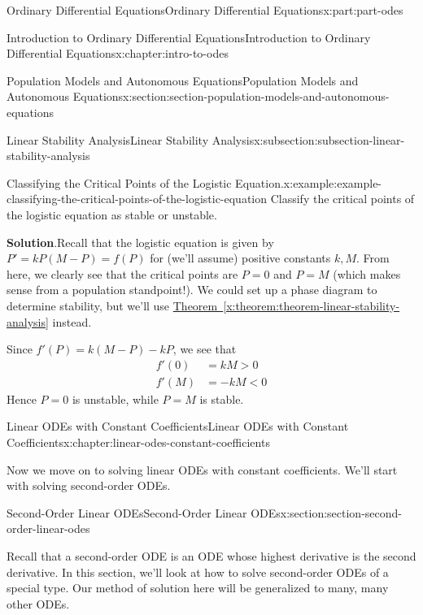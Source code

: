 \documentclass[oneside,10pt,]{book}
\newcommand{\blocktitlefont}{\relax}
\newcommand{\xreffont}{\relax}
\numberwithin{equation}{part}
\newcommand{\lt}{<}
\newcommand{\gt}{>}
\begin{document}
\begin{partptx}{Ordinary Differential Equations}{}{Ordinary Differential Equations}{}{}{x:part:part-odes}
\begin{chapterptx}{Introduction to Ordinary Differential Equations}{}{Introduction to Ordinary Differential Equations}{}{}{x:chapter:intro-to-odes}
\begin{sectionptx}{Population Models and Autonomous Equations}{}{Population Models and Autonomous Equations}{}{}{x:section:section-population-models-and-autonomous-equations}
\begin{subsectionptx}{Linear Stability Analysis}{}{Linear Stability Analysis}{}{}{x:subsection:subsection-linear-stability-analysis}
\begin{example}{Classifying the Critical Points of the Logistic Equation.}{x:example:example-classifying-the-critical-points-of-the-logistic-equation}%
Classify the critical points of the logistic equation as stable or unstable.%
\par\smallskip%
\noindent\textbf{\blocktitlefont Solution}.\hypertarget{g:solution:idp105548780207136}{}\quad{}Recall that the logistic equation is given by \(P' = kP(M-P) = f(P)\) for (we'll assume) positive constants \(k,M\). From here, we clearly see that the critical points are \(P = 0\) and \(P = M\) (which makes sense from a population standpoint!). We could set up a phase diagram to determine stability, but we'll use \hyperref[x:theorem:theorem-linear-stability-analysis]{Theorem~{\xreffont\ref{x:theorem:theorem-linear-stability-analysis}}} instead.%
\par
Since \(f'(P) = k(M-P) - kP\), we see that%
\begin{align*}
f'(0) & = kM \gt 0\\
f'(M) & = -kM \lt 0 
\end{align*}
Hence \(P = 0\) is unstable, while \(P = M\) is stable.%
\end{example}
\end{subsectionptx}
\end{sectionptx}
\end{chapterptx}
%
\typeout{************************************************}
\typeout{************************************************}
%
\begin{chapterptx}{Linear ODEs with Constant Coefficients}{}{Linear ODEs with Constant Coefficients}{}{}{x:chapter:linear-odes-constant-coefficients}
\begin{introduction}{}%
Now we move on to solving linear ODEs with constant coefficients. We'll start with solving second-order ODEs.%
\end{introduction}%
%
%
\typeout{************************************************}
\typeout{************************************************}
%
\begin{sectionptx}{Second-Order Linear ODEs}{}{Second-Order Linear ODEs}{}{}{x:section:section-second-order-linear-odes}
\begin{introduction}{}%
Recall that a second-order ODE is an ODE whose highest derivative is the second derivative. In this section, we'll look at how to solve second-order ODEs of a special type. Our method of solution here will be generalized to many, many other ODEs.%

\end{introduction}
\end{sectionptx}
\end{chapterptx}
\end{partptx}
\end{document}
